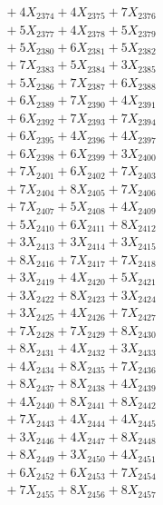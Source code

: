 \documentclass[a4paper,10pt]{article}
\begin{document}
{\begin{align}
&\;  + 4 X_{2374} + 4 X_{2375} + 7 X_{2376} \\[0.3ex]
&\;  + 5 X_{2377} + 4 X_{2378} + 5 X_{2379} \\[0.5ex]\allowbreak
&\;  + 5 X_{2380} + 6 X_{2381} + 5 X_{2382} \\[0.3ex]
&\;  + 7 X_{2383} + 5 X_{2384} + 3 X_{2385} \\[0.3ex]
&\;  + 5 X_{2386} + 7 X_{2387} + 6 X_{2388} \\[0.3ex]
&\;  + 6 X_{2389} + 7 X_{2390} + 4 X_{2391} \\[0.3ex]
&\;  + 6 X_{2392} + 7 X_{2393} + 7 X_{2394} \\[0.3ex]
&\;  + 6 X_{2395} + 4 X_{2396} + 4 X_{2397} \\[0.3ex]
&\;  + 6 X_{2398} + 6 X_{2399} + 3 X_{2400} \\[0.3ex]
&\;  + 7 X_{2401} + 6 X_{2402} + 7 X_{2403} \\[0.3ex]
&\;  + 7 X_{2404} + 8 X_{2405} + 7 X_{2406} \\[0.3ex]
&\;  + 7 X_{2407} + 5 X_{2408} + 4 X_{2409} \\[0.5ex]\allowbreak
&\;  + 5 X_{2410} + 6 X_{2411} + 8 X_{2412} \\[0.3ex]
&\;  + 3 X_{2413} + 3 X_{2414} + 3 X_{2415} \\[0.3ex]
&\;  + 8 X_{2416} + 7 X_{2417} + 7 X_{2418} \\[0.3ex]
&\;  + 3 X_{2419} + 4 X_{2420} + 5 X_{2421} \\[0.3ex]
&\;  + 3 X_{2422} + 8 X_{2423} + 3 X_{2424} \\[0.3ex]
&\;  + 3 X_{2425} + 4 X_{2426} + 7 X_{2427} \\[0.3ex]
&\;  + 7 X_{2428} + 7 X_{2429} + 8 X_{2430} \\[0.3ex]
&\;  + 8 X_{2431} + 4 X_{2432} + 3 X_{2433} \\[0.3ex]
&\;  + 4 X_{2434} + 8 X_{2435} + 7 X_{2436} \\[0.3ex]
&\;  + 8 X_{2437} + 8 X_{2438} + 4 X_{2439} \\[0.5ex]\allowbreak
&\;  + 4 X_{2440} + 8 X_{2441} + 8 X_{2442} \\[0.3ex]
&\;  + 7 X_{2443} + 4 X_{2444} + 4 X_{2445} \\[0.3ex]
&\;  + 3 X_{2446} + 4 X_{2447} + 8 X_{2448} \\[0.3ex]
&\;  + 8 X_{2449} + 3 X_{2450} + 4 X_{2451} \\[0.3ex]
&\;  + 6 X_{2452} + 6 X_{2453} + 7 X_{2454} \\[0.3ex]
&\;  + 7 X_{2455} + 8 X_{2456} + 8 X_{2457} \\[0.3ex]

\end{align}}
\end{document}
